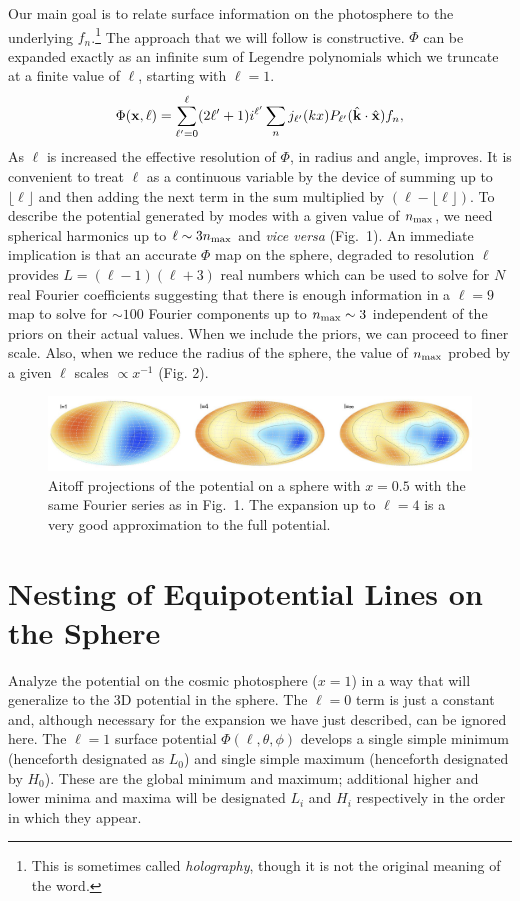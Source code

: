 \documentclass[12pt]{article}
\begin{document}
Our main goal is to relate surface information on the photosphere to the underlying $f_n$.\footnote{This is sometimes called \emph{holography}, though it is not the original meaning of the word.} The approach that we will follow is constructive. $\Phi$ can be expanded exactly as an infinite sum of Legendre polynomials which we truncate at a finite value of $\ell$, starting with $\ell=1$. 
\begin{equation}
\Phi({\bf x,\ell})=\sum_{\ell'=0} ^\ell(2\ell'+1)i^{\ell'}\sum_nj_{\ell'}(kx)P_{\ell'}({\hat{\bf k}}\cdot{\hat{\bf x}})f_n,
\end{equation}
As $\ell$ is increased the effective resolution of $\Phi$, in radius and angle, improves. It is convenient to treat $\ell$ as a continuous variable by the device of summing up to $\lfloor\ell\rfloor$  and then adding the next term in the sum multiplied by $(\ell-\lfloor\ell\rfloor)$. To describe the potential generated by modes with a given value of $n_{\rm max}$, we need spherical harmonics up to $\ell\sim3n_{\rm max}$ and {\it vice versa} (Fig.~1). An immediate implication is that an accurate $\Phi$ map on the sphere, degraded to resolution $\ell$ provides $L=(\ell-1)(\ell+3)$ real numbers which can be used to solve for $N$ real Fourier coefficients suggesting that there is enough information in a $\ell=9$ map to solve for $\sim100$ Fourier components up to $n_{\rm max}\sim3$ independent of the priors on their actual values. When we include the priors, we can proceed to finer scale. Also, when we reduce the radius of the sphere, the value of $n_{\rm max}$  probed by a given $\ell$ scales $\propto x^{-1}$ (Fig. 2).

\begin{figure}[h!]
\centering
\includegraphics[width=6in]{fig2.jpg} 
\caption{Aitoff projections of the potential on a sphere with $x=0.5$ with the same Fourier series as in Fig.~1. The expansion up to $\ell=4$ is a very good approximation to the full potential.}
\end{figure}

\section{Nesting of Equipotential Lines on the Sphere}
Analyze the potential on the cosmic photosphere ($x=1$) in a way that will generalize to the 3D potential in the sphere. The $\ell=0$ term is just a constant and, although necessary for the expansion we have just described, can be ignored here.  The $\ell=1$ surface potential $\Phi(\ell,\theta,\phi)$ develops a single simple minimum (henceforth designated as $L_0$) and single simple maximum (henceforth designated by $H_0$). These are the global  minimum and maximum; additional higher and lower minima and maxima will be designated $L_i$ and $H_i$ respectively in the order in which they appear.
\end{document}
